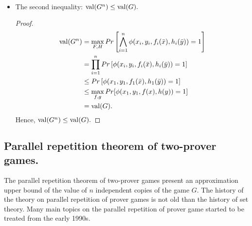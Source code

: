 \begin{itemize}
\begin{proof}
$\val (G^n)= \max\limits_{F,H} Pr \left[\bigwedge\limits_{i=1}^n \phi (x_i,y_i, f_i(\bar{x}), h_i(\bar{y}))=1 \right] \geq Pr \left[\bigwedge\limits_{i=1}^n \phi (x_i,y_i, f_i(\bar{x}), h_i(\bar{y}))=1 \right]= \prod\limits_{i=1}^n Pr \left[ \phi (x_i,y_i, f(\bar{x}), h(\bar{y}))=1 \right]=\prod\limits_{i=1}^n \val (G)= \val (G)^n .$

Hence, $\val (G^n) \geq \val (G)^n.$
\end{proof}

\item The second inequality: $\mathrm{val} (G^n) \leq \mathrm{val} (G).$

\begin{proof}
 \begin{align*}
 \mathrm{val} (G^n) & = \max\limits_{F,H} Pr \left[\bigwedge\limits_{i=1}^n \phi (x_i,y_i, f_i(\bar{x}), h_i(\bar{y}))=1 \right] \\
            &= \prod\limits_{i=1}^n Pr \left[ \phi (x_i,y_i, f_i(\bar{x}), h_i(\bar{y}))=1 \right]
   \\
 & \leq Pr \left[ \phi (x_1,y_1, f_1(\bar{x}), h_1(\bar{y}))=1 \right] \\
 &  \leq \max\limits_{f,g} Pr[\phi(x_1,y_1,f(x),h(y))=1] \\
 & = \mathrm{val} (G).
 \end{align*}
Hence, $\mathrm{val} (G^n) \leq \mathrm{val} (G).$
\end{proof}


\end{itemize}



\subsection{Parallel repetition theorem of two-prover games.}

The parallel repetition theorem of  two-prover games present an  approximation upper bound of the value of $n$ independent copies of the game $G$. The history of the theory on parallel repetition of prover games is not old than the history of set theory.
Many main topics on the parallel repetition of prover game started to be treated from the early 1990s. 

